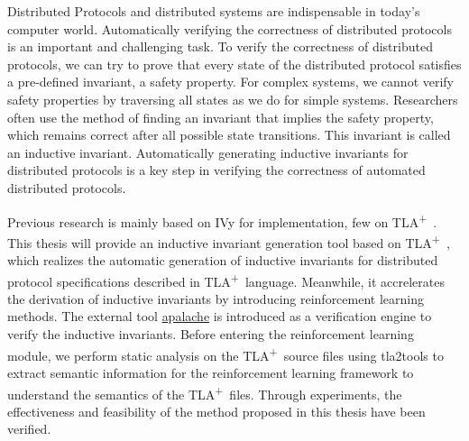 \documentclass[
    type = bachelor,
    degree = academic,
    twoside,
    fontset = win,
    decl-page
]
{njuthesis}
\newcommand{\TLA}{TLA\textsuperscript{+}\ }
\begin{document}
\begin{abstract*}
    Distributed Protocols and distributed systems are indispensable in today's computer world. Automatically verifying the correctness of distributed protocols is an important and challenging task.
    To verify the correctness of distributed protocols, we can try to prove that every state of the distributed protocol satisfies a pre-defined invariant, a safety property.
    For complex systems, we cannot verify safety properties by traversing all states as we do for simple systems.
    Researchers often use the method of finding an invariant that implies the safety property, which remains correct after all possible state transitions. This invariant is called an inductive invariant.
    Automatically generating inductive invariants for distributed protocols is a key step in verifying the correctness of automated distributed protocols.

    Previous research is mainly based on IVy for implementation, few on \TLA. 
    This thesis will provide an inductive invariant generation tool based on \TLA, which realizes the automatic generation of inductive invariants for distributed protocol specifications described in \TLA language.
    Meanwhile, it accrelerates the derivation of inductive invariants by introducing reinforcement learning methods.
    The external tool \href{https://apalache.informal.systems/}{apalache} is introduced as a verification engine to verify the inductive invariants.
    Before entering the reinforcement learning module, we perform static analysis on the \TLA source files using tla2tools to extract semantic information for the reinforcement learning framework to understand the semantics of the \TLA files.
    Through experiments, the effectiveness and feasibility of the method proposed in this thesis have been verified.
\end{abstract*}

\tableofcontents

\mainmatter












\printbibliography
\end{document}

